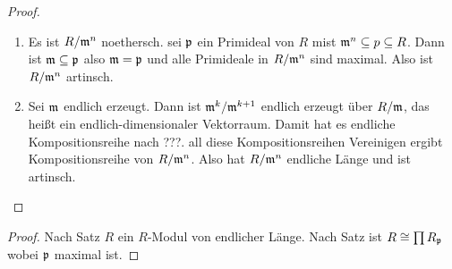 \begin{proof}
    \begin{enumerate}
        \item Es ist \(R/\mathfrak{m}^n\) noethersch. sei \(\mathfrak{p}\) ein Primideal von \(R\) mist \(\mathfrak{m}^n\subseteq p\subseteq R\).
        Dann ist \(\mathfrak{m}\subseteq \mathfrak{p}\) also \(\mathfrak{m}=\mathfrak{p}\) und alle Primideale in \(R/\mathfrak{m}^n\) sind maximal. Also ist \(R/\mathfrak{m}^n\) artinsch.
        \item Sei \(\mathfrak{m}\) endlich erzeugt. Dann ist \(\mathfrak{m}^k/\mathfrak{m}^{k+1}\) endlich erzeugt über \(R/\mathfrak{m}\), das heißt ein endlich-dimensionaler Vektorraum. Damit hat es endliche Kompositionsreihe nach ???.
        all diese Kompositionsreihen Vereinigen ergibt Kompositionsreihe von \(R/\mathfrak{m}^n\). Also hat \(R/\mathfrak{m}^n\) endliche Länge und ist artinsch.
    \end{enumerate}
\end{proof}

\begin{proof}
    Nach Satz   \(R\) ein \(R\)-Modul von endlicher Länge. Nach Satz  ist \(R\cong \prod R_{\mathfrak{p}}\) wobei \(\mathfrak{p}\) maximal ist.
\end{proof}


